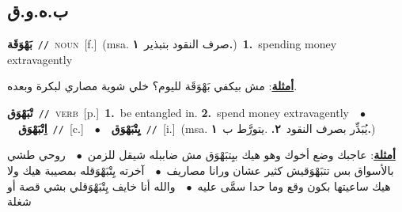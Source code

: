 \documentclass[10pt,a4paper,twoside]{article} %
\begin{document}
\begin{multicols}{2}
\vspace{-3mm}
\subsection*{\color{blue}\foreignlanguage{arabic}{ب.ه.و.ق}\color{blue}{}} 

{\setlength\topsep{0pt}\textbf{\foreignlanguage{arabic}{بَهْوَقَة}}\ {\color{gray}\texttt{//}\color{black}}\ \textsc{noun}\ [f.]\ \color{gray}(msa. \foreignlanguage{arabic}{صرف النقود بتبذير}~\foreignlanguage{arabic}{\textbf{١.}})\color{black}\ \textbf{1.}~spending money extravagently\  \begin{flushright}\color{gray}\foreignlanguage{arabic}{\textbf{\underline{\foreignlanguage{arabic}{أمثلة}}}: مش بيكفي بَهْوَقَة لليوم؟ خلي شوية مصاري لبكرة وبعده.}\end{flushright}\color{black}} \vspace{2mm}

{\setlength\topsep{0pt}\textbf{\foreignlanguage{arabic}{تْبَهْوَق}}\ {\color{gray}\texttt{//}\color{black}}\ \textsc{verb}\ [p.]\ \textbf{1.}~be entangled in.  \textbf{2.}~spend money extravagently\ \ $\bullet$\ \ \setlength\topsep{0pt}\textbf{\foreignlanguage{arabic}{اِتْبَهْوَق}}\ {\color{gray}\texttt{//}\color{black}}\ [c.]\ \ $\bullet$\ \ \setlength\topsep{0pt}\textbf{\foreignlanguage{arabic}{يِتْبَهْوَق}}\ {\color{gray}\texttt{//}\color{black}}\ [i.]\ \color{gray}(msa. \foreignlanguage{arabic}{يُبَذِّر بصرف النقود}~\foreignlanguage{arabic}{\textbf{٢.}}  .\foreignlanguage{arabic}{يتورَّط ب}~\foreignlanguage{arabic}{\textbf{١.}})\color{black}\  \begin{flushright}\color{gray}\foreignlanguage{arabic}{\textbf{\underline{\foreignlanguage{arabic}{أمثلة}}}: عاجبك وضع أخوك وهو هيك بيِتبَهْوَق مش ضاببله شيقل للزمن\ $\bullet$\ \  روحي طشي بالأسواق بس تتبَهْوَقيش كثير عشان ورانا مصاريف\ $\bullet$\ \  آخرته  يِتْبَهْوَقله بمصيبة هيك ولا هيك ساعيتها بكون وقع وما حدا سمَّى عليه\ $\bullet$\ \  والله أنا خايف يِتْبَهْوَقلي بشي قصة أو شغلة}\end{flushright}\color{black}} \vspace{2mm}


\end{multicols}
\end{document}
